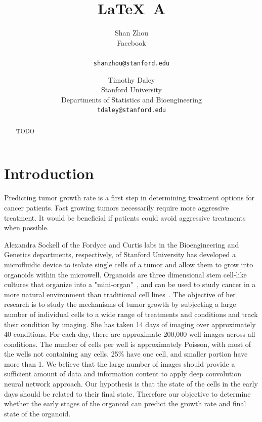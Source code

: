 \documentclass[10pt,twocolumn,letterpaper]{article}
\begin{document}
\title{\LaTeX\ A }

\author{Shan Zhou \\
Facebook \\
\\
{\tt\small shanzhou@stanford.edu}
\and
Timothy Daley \\
Stanford University \\
Departments of Statistics and Bioengineering \\
{\tt\small tdaley@stanford.edu}
}

\maketitle

\begin{abstract}
TODO   
\end{abstract}

\section{Introduction}

Predicting tumor growth rate is a first step in determining treatment options for cancer patients.  Fast growing tumors necessarily require more aggressive treatment.  It would be beneficial if patients could avoid aggressive treatments when possible.  

Alexandra Sockell of the Fordyce and Curtis labs in the Bioengineering and Genetics departments, respectively, of Stanford University has developed a microfluidic device to isolate single cells of a tumor and allow them to grow into organoids  within the microwell.  Organoids are three dimensional stem cell-like cultures that organize into a "mini-organ"~\cite{rios2018imaging}, and can be used to study cancer in a more natural environment than traditional cell lines~\cite{drost2018organoids}.
The objective of her research is to study the mechanisms of tumor growth by subjecting a large number of  individual cells to a wide range of treatments and conditions and track their condition by imaging.  She has taken 14 days of imaging over approximately 40 conditions.    For each day, there are approximate 200,000 well images across all conditions.  The number of cells per well is approximately Poisson, with most of the wells not containing any cells, 25\% have one cell, and smaller portion have more than 1.  We believe that the large number of images should provide a sufficient amount of data and information content to apply deep convolution neural network approach.  Our hypothesis is that the state of the cells in the early days should be related to their final state.  Therefore our objective to determine whether the early stages of the organoid can predict the growth rate and final state of the organoid.    
\end{document}

